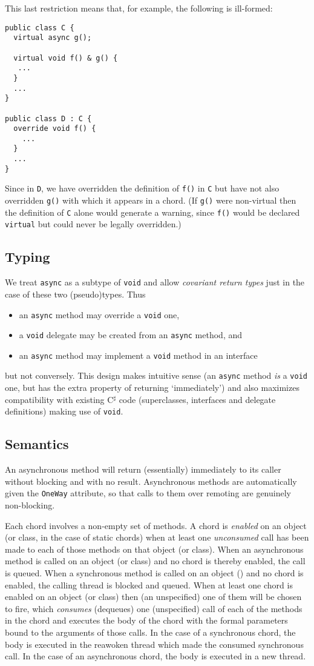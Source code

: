 \documentclass{article}
\newcommand{\csharp}{\mbox{C$^\sharp$}}
\begin{document}
This last restriction means that, for example, the following is
ill-formed:
\begin{verbatim}
public class C {
  virtual async g();

  virtual void f() & g() {
   ...
  }
  ...
}

public class D : C {
  override void f() {
    ...
  }
  ...
}
\end{verbatim}
Since in \texttt{D}, we have overridden the definition of \texttt{f()}
in \texttt{C} but have not also overridden \texttt{g()} with which it
appears in a chord. (If \texttt{g()} were non-virtual then the
definition of \texttt{C} alone would generate a warning, since
\texttt{f()} would be declared \texttt{virtual} but could never be
legally overridden.)

\subsection{Typing}
We treat \verb$async$ as a subtype of \verb$void$ and allow \emph{covariant
return types} just in the case of these two (pseudo)types. Thus
\begin{itemize}
\item an \verb$async$ method may override a \verb$void$
one, 
\item a \verb$void$ delegate may be created from
an \verb$async$ method, and
\item an \verb$async$ method may implement a \verb$void$ method in an interface
\end{itemize}
but not conversely. This design makes intuitive sense (an \verb$async$
method \emph{is} a \verb$void$ one, but has the extra property of
returning `immediately') and also maximizes compatibility with
existing {\csharp} code (superclasses, interfaces and delegate
definitions) making use of \verb$void$.
\subsection{Semantics}
An asynchronous method will return (essentially) immediately to its
caller without blocking and with no result. Asynchronous methods are
automatically given the \texttt{OneWay} attribute, so that calls to
them over remoting are genuinely non-blocking.

Each chord involves a non-empty set of methods. A chord is
\emph{enabled} on an object (or class, in the case of static chords)
when at least one \emph{unconsumed} call has been made to each of
those methods on that object (or class). When an asynchronous method
is called on an object (or class) and no chord is thereby enabled, the
call is queued. When a synchronous method is called on an object ()
and no chord is enabled, the calling thread is blocked and
queued. When at least one chord is enabled on an object (or class)
then (an unspecified) one of them will be chosen to fire, which
\emph{consumes} (dequeues) one (unspecified) call of each of the
methods in the chord and executes the body of the chord with the
formal parameters bound to the arguments of those calls. In the case
of a synchronous chord, the body is executed in the reawoken thread
which made the consumed synchronous call. In the case of an
asynchronous chord, the body is executed in a new thread.
\end{document}
